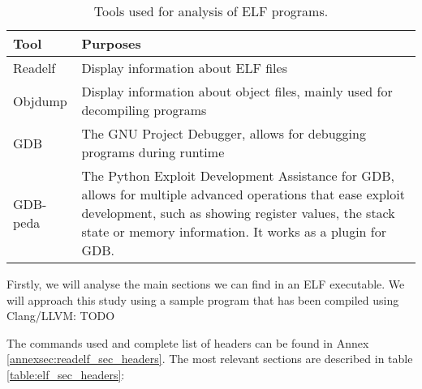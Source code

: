 \begin{table}[htbp]
\begin{tabular}{|>{\centering\arraybackslash}p{3cm}|>{\centering\arraybackslash}p{10cm}|}
\hline
Tool & Purposes\\
\hline
\hline
Readelf & Display information about ELF files\\
\hline
Objdump & Display information about object files, mainly used for decompiling programs\\
\hline
GDB & The GNU Project Debugger, allows for debugging programs during runtime\\
\hline
GDB-peda & The Python Exploit Development Assistance for GDB, allows for multiple advanced operations that ease exploit development, such as showing register values, the stack state or memory information. It works as a plugin for GDB.\\
\hline
\end{tabular}
\caption{Tools used for analysis of ELF programs.}
\label{table:elf_tools}
\end{table}

Firstly, we will analyse the main sections we can find in an ELF executable. We will approach this study using a sample program that has been compiled using Clang/LLVM: TODO %

The commands used and complete list of headers can be found in Annex \ref{annexsec:readelf_sec_headers}. The most relevant sections are described in table \ref{table:elf_sec_headers}:

